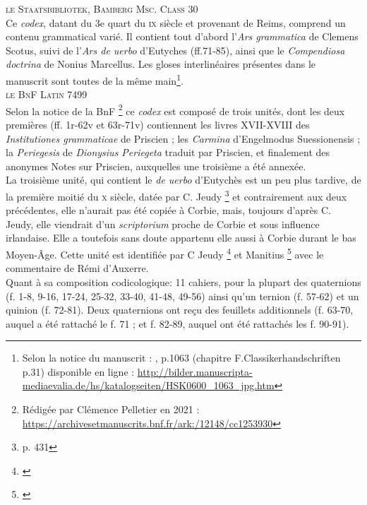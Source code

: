 \documentclass[a4paper, twoside, 12pt]{book}
\begin{document}
\textsc{le Staatsbibliotek, Bamberg Msc. Class 30}\\

Ce \textit{codex}, datant du 3e quart du \textsc{ix}\ieme{} siècle et provenant de Reims, comprend un contenu grammatical varié. Il contient tout d'abord l'\textit{Ars grammatica} de Clemens Scotus, suivi de l'\textit{Ars de uerbo} d'Eutyches (ff.71-85), ainsi que le \textit{Compendiosa doctrina} de Nonius Marcellus. Les gloses interlinéaires présentes dans le manuscrit sont toutes de la même main\footnote{Selon la notice du manuscrit : \cite{leitschuh1966katalog}, p.1063 (chapitre F.Classikerhandschriften p.31) disponible en ligne : \url{http://bilder.manuscripta-mediaevalia.de/hs/katalogseiten/HSK0600_1063_jpg.htm}}.\\

\textsc{le BnF Latin 7499}\\

Selon la notice de la BnF \footnote{Rédigée par Clémence Pelletier en 2021 : \url{https://archivesetmanuscrits.bnf.fr/ark:/12148/cc1253930}} ce \textit{codex} est composé de trois unités, dont les deux premières (ff. 1r-62v et 63r-71v) contiennent les livres XVII-XVIII des \textit{Institutiones grammaticae} de Priscien ; les \textit{Carmina} d'Engelmodus Suessionensis ; la \textit{Periegesis} de \textit{Dionysius Periegeta} traduit par Priscien, et finalement des anonymes Notes sur Priscien, auxquelles une troisième a été annexée. \\

La troisième unité, qui contient le \textit{de uerbo} d'Eutychès est un peu plus tardive, de la première moitié du \textsc{x}\ieme{} siècle, datée par C. Jeudy \footnote{ \cite{jeudy1974manuscrits} p. 431}  et contrairement aux deux précédentes, elle n’aurait pas été copiée à Corbie, mais, toujours d’après C. Jeudy, elle viendrait d’un \textit{scriptorium} proche de Corbie et sous influence irlandaise. Elle a toutefois sans doute appartenu elle aussi à Corbie durant le bas Moyen-Âge. Cette unité est identifiée par C Jeudy \footnote{\cite{jeudymanuscritMilan}} et Manitius \footnote{\cite{manitius1911karolongischen}} avec le commentaire de Rémi d'Auxerre.\\

Quant à sa composition codicologique: 11 cahiers, pour la plupart des quaternions (f. 1-8, 9-16, 17-24, 25-32, 33-40, 41-48, 49-56) ainsi qu’un ternion (f. 57-62) et un quinion (f. 72-81). Deux quaternions ont reçu des feuillets additionnels (f. 63-70, auquel a été rattaché le f. 71 ; et f. 82-89, auquel ont été rattachés les f. 90-91).\\
 
\end{document}
